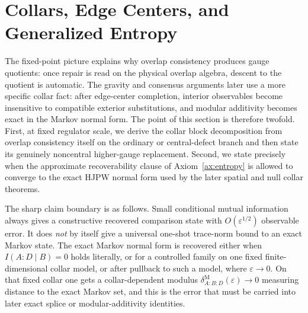 \documentclass[11pt]{article}
\begin{document}
\section{Collars, Edge Centers, and Generalized Entropy}

The fixed-point picture explains why overlap consistency produces gauge quotients: once repair is
read on the physical overlap algebra, descent to the quotient is automatic. The gravity and
consensus arguments later use a more specific collar fact: after edge-center completion, interior
observables become insensitive to compatible exterior substitutions, and modular additivity becomes
exact in the Markov normal form. The point of this section is therefore twofold. First, at fixed
regulator scale, we derive the collar block decomposition from overlap consistency itself on the
ordinary or central-defect branch and then state its genuinely noncentral higher-gauge replacement.
Second, we state precisely when the approximate recoverability clause of Axiom~\ref{ax:entropy} is
allowed to converge to the exact HJPW normal form used by the later spatial and null collar
theorems.

The sharp claim boundary is as follows. Small conditional mutual information always gives a constructive recovered comparison state with \(O(\varepsilon^{1/2})\) observable error. It does \emph{not} by itself give a universal one-shot trace-norm bound to an exact Markov state. The exact Markov normal form is recovered either when \(I(A:D\mid B)=0\) holds literally, or for a controlled family on one fixed finite-dimensional collar model, or after pullback to such a model, where \(\varepsilon\to0\). On that fixed collar one gets a collar-dependent modulus \(\delta^{\mathrm M}_{A:B:D}(\varepsilon)\to0\) measuring distance to the exact Markov set, and this is the error that must be carried into later exact splice or modular-additivity identities.
\end{document}
